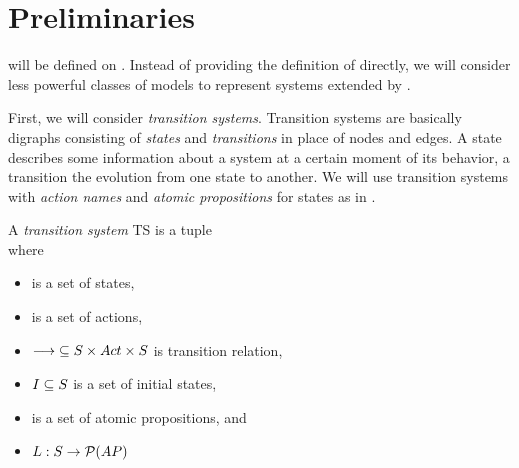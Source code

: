\documentclass[preview]{standalone}
\begin{document}
\section{Preliminaries} \label{ch:prelim}

\viewsNC will be defined on \chgphsN. Instead of providing the definition of \achgphN directly, we will consider less powerful classes of models to represent systems extended by \chgphsN.

First, we will consider \emph{transition systems}. Transition systems are basically digraphs consisting of \emph{states} and \emph{transitions} in place of nodes and edges. A state describes some information about a system at a certain moment of its behavior, a transition the evolution from one state to another. We will use transition systems with \emph{action names} and \emph{atomic propositions} for states as in \cite{Baier2008}.

\begin{definition}
	A \emph{transition system} TS is a tuple \\ \transitionsystem where
	\begin{itemize}
		\item \states is a set of states,
		\item \actions is a set of actions,
		\item ${\longrightarrow} \subseteq {S} \times {Act} \times {S}$ is transition relation,
		\item ${I} \subseteq {S}$ is a set of initial states,
		\item \atomicprops is a set of atomic propositions, and
		\item ${L} : {S} \to {\mathcal{P}(\ensuremath{{AP}})}$
	\end{itemize}
\end{definition}

\end{document}
